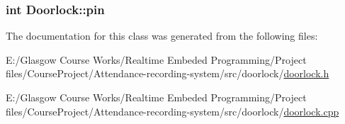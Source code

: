 \subsubsection[{pin}]{\setlength{\rightskip}{0pt plus 5cm}int Doorlock\+::pin\hspace{0.3cm}{\ttfamily [private]}}\label{class_doorlock_a47bd9a55d9497c8276026ed0f6ed1bf5}


The documentation for this class was generated from the following files\+:\begin{DoxyCompactItemize}
\item 
E\+:/\+Glasgow Course Works/\+Realtime Embeded Programming/\+Project files/\+Course\+Project/\+Attendance-\/recording-\/system/src/doorlock/\hyperlink{doorlock_8h}{doorlock.\+h}\item 
E\+:/\+Glasgow Course Works/\+Realtime Embeded Programming/\+Project files/\+Course\+Project/\+Attendance-\/recording-\/system/src/doorlock/\hyperlink{doorlock_8cpp}{doorlock.\+cpp}\end{DoxyCompactItemize}
